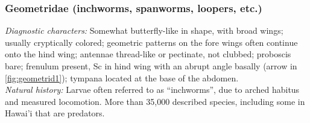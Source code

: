 \documentclass[letterpaper, 11pt]{article}
\begin{document}
\subsubsection{Geometridae (inchworms, spanworms, loopers, etc.)}
\noindent{}\textit{Diagnostic characters:} Somewhat butterfly-like in shape, with broad wings; usually cryptically colored; geometric patterns on the fore wings often continue onto the hind wing; antennae thread-like or pectinate, not clubbed; proboscis bare; frenulum present, Sc in hind wing with an abrupt angle basally (arrow in \ref{fig:geometrid1}); tympana located at the base of the abdomen.\\

\noindent{}\textit{Natural history:} Larvae often referred to as ``inchworms'', due to arched habitus and measured locomotion. More than 35,000 described species, including some in Hawai'i that are predators.
\end{document}
